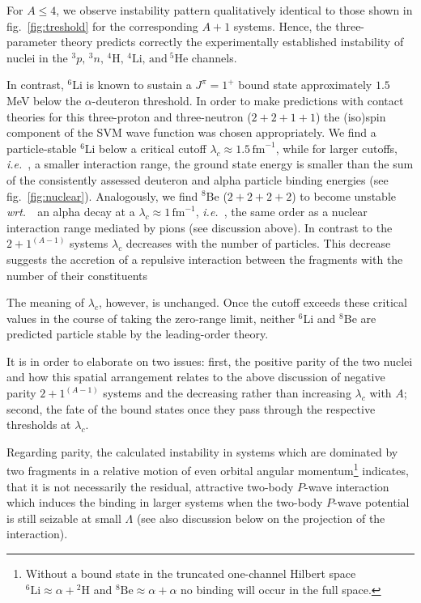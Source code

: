 \documentclass[preprint,12pt]{elsarticle}
\newcommand{\lc}{\ensuremath{\lambda_c}}
\newcommand{\fm}{\ensuremath{\,\text{fm}^{-1}}}
\newcommand{\abb}{\ensuremath{2\!+\!1^{(A-1)}}}
\newcommand{\wrt}{\textit{wrt.}~}
\newcommand{\ie}{\textit{i.e.}~}
\newcommand{\figref}[1]{fig.~\ref{#1}}
\begin{document}
For $A\le 4$, we observe instability pattern qualitatively identical to
those shown in \figref{fig:treshold} for the corresponding $A+1$ systems.
Hence, the three-parameter theory predicts correctly the experimentally
established instability of nuclei in the
$^3p,\,^3n,\,^4\text{H},\,^4\text{Li},\,\text{and}~^5\text{He}$ channels.


In contrast, $^6$Li is known to sustain a $J^\pi=1^+ $ bound state
approximately $1.5~$MeV below the $\alpha$-deuteron threshold.
In order to make predictions with contact theories for this
three-proton and three-neutron ($2+2+1+1$) the (iso)spin component of the SVM
wave function was chosen appropriately.
We find a particle-stable $^6$Li below a critical cutoff
$\lc\approx1.5\fm$, while for larger cutoffs,
\ie, a smaller interaction range, the ground state energy is
smaller than the sum of the consistently assessed deuteron and alpha particle binding
energies (see \figref{fig:nuclear}).
Analogously, we find $^8$Be ($2+2+2+2$) to become unstable \wrt~an alpha decay at a
$\lc\approx 1\fm$, \ie, the same order as a nuclear interaction
range mediated by pions (see discussion above).
In contrast to the $\abb$ systems $\lc$ decreases with the number of particles.
This decrease suggests the accretion of a repulsive
interaction between the fragments with the number of their constituents

The meaning of $\lc$, however, is unchanged.
Once the cutoff exceeds these critical values in the course of taking the
zero-range limit, neither $^6$Li and $^8$Be are predicted particle stable
by the leading-order theory.

It is in order to elaborate on two issues: first, the positive parity of the
two nuclei and how this spatial arrangement relates to the above discussion of
negative parity $\abb$ systems and the decreasing rather than increasing $\lc$ with $A$;
second, the fate of the bound states once they pass through the respective thresholds at $\lc$.

Regarding parity, the calculated instability in systems which are dominated by
two fragments in a relative motion of even orbital angular
momentum\footnote{Without a bound state in the truncated one-channel Hilbert space
$^6\text{Li}\approx\alpha+{}^2\text{H}$ and $^8\text{Be}\approx\alpha+\alpha$ no
binding will occur in the full space.} indicates, that it is not necessarily the
residual, attractive two-body $P$-wave interaction which induces the binding
in larger systems
when the two-body $P$-wave potential is still seizable at small $\Lambda$
(see also discussion below on the projection of the interaction).
\end{document}
